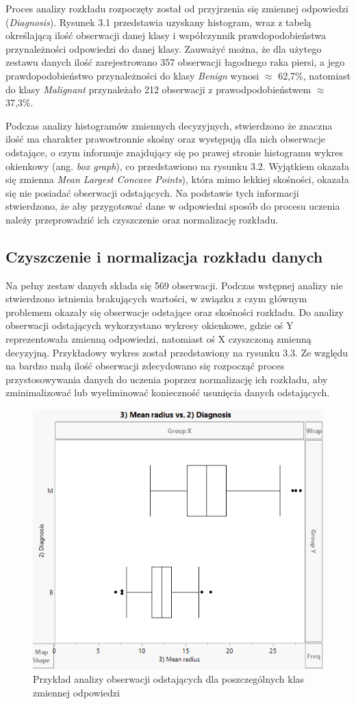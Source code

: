 	
	Proces analizy rozkładu rozpoczęty został od przyjrzenia się zmiennej odpowiedzi (\textit{Diagnosis}). Rysunek 3.1 przedstawia uzyskany histogram, wraz z tabelą określającą ilość obserwacji danej klasy i współczynnik prawdopodobieństwa przynależności odpowiedzi do danej klasy. Zauważyć można, że dla użytego zestawu danych ilość zarejestrowano 357 obserwacji łagodnego raka piersi, a jego prawdopodobieństwo przynależności do klasy \textit{Benign} wynosi $\approx$ 62,7\%, natomiast do klasy \textit{Malignant} przynależało 212 obserwacji z prawodpodobieństwem $\approx$ 37,3\%.
		
	Podczas analizy histogramów zmiennych decyzyjnych, stwierdzono że znaczna ilość ma charakter prawostronnie skośny oraz występują dla nich obserwacje odstające, o czym informuje znajdujący się po prawej stronie histogramu wykres okienkowy (ang. \textit{box graph}), co przedstawiono na rysunku 3.2. Wyjątkiem okazała się zmienna \textit{Mean Largest Concave Points}), która mimo lekkiej skośności, okazała się nie posiadać obserwacji odstających. Na podstawie tych informacji stwierdzono, że aby przygotować dane w odpowiedni sposób do procesu uczenia należy przeprowadzić ich czyszczenie oraz normalizację rozkładu.
	
	\subsection{Czyszczenie i normalizacja rozkładu danych}
	
	Na pełny zestaw danych składa się 569 obserwacji. Podczas wstępnej analizy nie stwierdzono istnienia brakujących wartości, w związku z czym głównym problemem okazały się obserwacje odstające oraz skośności rozkładu. Do analizy obserwacji odstających wykorzystano wykresy okienkowe, gdzie oś Y reprezentowała zmienną odpowiedzi, natomiast oś X czyszczoną zmienną decyzyjną. Przykładowy wykres został przedstawiony na rysunku 3.3. Ze względu na bardzo małą ilość obserwacji zdecydowano się rozpocząć proces przystosowywania danych do uczenia poprzez normalizację ich rozkładu, aby zminimalizować lub wyeliminować konieczność usunięcia danych odstających. 
	
	\begin{figure}[!ht]
		\centering
		\includegraphics[width=0.7\linewidth]{Rysunki/Rozdzial2/box_graph}
		\caption{Przykład analizy obserwacji odstających dla poszczególnych klas zmiennej odpowiedzi}
		\label{fig:boxgraph}
	\end{figure}

